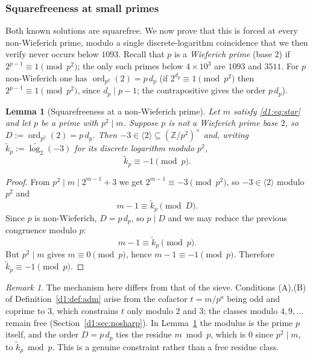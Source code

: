 \documentclass[a4paper]{article}
\theoremstyle{plain}
\newtheorem{lemma}{Lemma}[subsection]
\theoremstyle{definition}
\theoremstyle{remark}
\newtheorem{remark}{Remark}[subsection]
\newcommand{\Z}{\mathbb{Z}}
\newcommand{\ord}{\operatorname{ord}}
\newcommand{\gen}[1]{\langle #1 \rangle}
\begin{document}
\subsubsection{Squarefreeness at small primes}\label{d1:sec:sqfree}

Both known solutions are squarefree. We now prove that this is forced at every non-Wieferich
prime, modulo a single discrete-logarithm coincidence that we then verify never occurs below
$1093$. Recall that $p$ is a \emph{Wieferich prime} (base $2$) if $2^{p-1}\equiv 1\pmod{p^{2}}$;
the only such primes below $4\times 10^{3}$ are $1093$ and $3511$. For $p$ non-Wieferich one has
$\ord_{p^{2}}(2)=p\,d_{p}$ (if $2^{d_{p}}\equiv 1\pmod{p^{2}}$ then $2^{p-1}\equiv 1\pmod{p^{2}}$,
since $d_{p}\mid p-1$; the contrapositive gives the order $p\,d_{p}$).

\begin{lemma}[Squarefreeness at a non-Wieferich prime]\label{d1:lem:sqfree}
Let $m$ satisfy \eqref{d1:eq:star} and let $p$ be a prime with $p^{2}\mid m$. Suppose $p$ is not a
Wieferich prime base $2$, so $D:=\ord_{p^{2}}(2)=p\,d_{p}$. Then $-3\in\gen{2}\subseteq
(\Z/p^{2})^{\times}$ and, writing $\widetilde{k}_{p}:=\widetilde{\log_{2}}(-3)$ for its discrete
logarithm modulo $p^{2}$,
\[
\widetilde{k}_{p}\equiv -1\pmod{p}.
\]
\end{lemma}

\begin{proof}
From $p^{2}\mid m\mid 2^{m-1}+3$ we get $2^{m-1}\equiv-3\pmod{p^{2}}$, so $-3\in\gen{2}$ modulo
$p^{2}$ and
\[
m-1\equiv\widetilde{k}_{p}\pmod{D}.
\]
Since $p$ is non-Wieferich, $D=p\,d_{p}$, so $p\mid D$ and we may reduce the previous congruence
modulo $p$:
\[
m-1\equiv\widetilde{k}_{p}\pmod{p}.
\]
But $p^{2}\mid m$ gives $m\equiv 0\pmod p$, hence $m-1\equiv-1\pmod p$. Therefore
$\widetilde{k}_{p}\equiv-1\pmod p$.
\end{proof}

\begin{remark}
The mechanism here differs from that of the sieve. Conditions (A),(B) of
Definition~\ref{d1:def:adm} arise from the cofactor $t=m/p^{a}$ being odd and coprime to $3$, which
constrains $t$ only modulo $2$ and $3$; the classes modulo $4,9,\dots$ remain free
(Section~\ref{d1:sec:nosharp}). In Lemma~\ref{d1:lem:sqfree} the modulus is the prime $p$ itself, and
the order $D=p\,d_{p}$ ties the residue $m\bmod p$, which is $0$ since $p^{2}\mid m$, to
$\widetilde{k}_{p}\bmod p$. This is a genuine constraint rather than a free residue class.
\end{remark}
\end{document}

